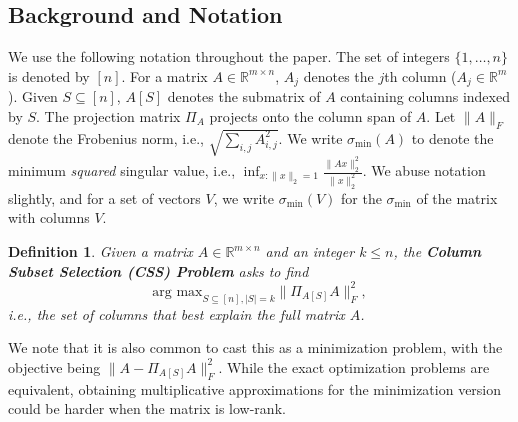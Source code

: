 \documentclass{article}
\newtheorem{defin}{Definition}\newtheorem{thm}{Theorem}\newtheorem{exe}{Exercise}\newtheorem{exa}{Example}\newtheorem{fact}{Fact}\newtheorem{prop}{Proposition}\newtheorem{lemma}{Lemma}\newtheorem{corol}{Corollary}\newtheorem{conj}{Conjecture}\newtheorem{remark}{Remark}\newtheorem{discussion}{Discussion}\newtheorem{conc}{Conclusion}
\newcommand{\Real}{\mathbb{R}}
\newcommand{\argmax}{\text{arg max}}
\newcommand{\norm}[1]{\lVert #1 \rVert}
\begin{document}
\subsection{Background and Notation}
We use the following notation throughout the paper. The set of integers $\{1, \dots, n\}$ is denoted by $[n]$. For a matrix $A \in \Real^{m \times n}$, $A_j$ denotes the $j$th column ($A_j \in \Real^m$). Given $S \subseteq [n]$, $A[S]$ denotes the submatrix of $A$ containing columns indexed by $S$. The projection matrix $\Pi_A$ projects onto the column span of $A$. Let $\norm{A}_F$ denote the Frobenius norm, i.e., $\sqrt{\sum_{i,j} A_{i, j}^2}$. We write $\sigma_{\min}(A)$ to denote the minimum \textit{squared} singular value, i.e., $\inf_{x:\norm{x}_2 = 1} \frac{\|Ax\|_2^2}{\|x\|_2^2}$. We abuse notation slightly, and for a set of vectors $V$, we write $\sigma_{\min}(V)$ for the $\sigma_{\min}$ of the matrix with columns $V$.

\iffalse
{\bf Submodular optimization.}  Given a finite set $\Omega$ and a set function $f : 2^{\Omega} \to \Real$, define the marginal gain of adding an element $x \in \Omega$ to a set $S \subseteq \Omega$ by $\Delta(x | S) = f(S \cup \{x\}) - f(S)$. $f$ is said to be submodular if $\Delta(x | S) \geq \Delta(x | T)$ for any subsets $S \subseteq T \subseteq \Omega$ and any element $x \in \Omega \setminus T$. This is a formalization of the well-known economic principle of decreasing marginal utility. $f$ is further said to be nonnegative if $f(S) \geq 0$ for any $S \subseteq \Omega$, and monotonically nondecreasing if $f(S) \leq f(T)$ for any $S \subseteq T \subseteq \Omega$. The theory of maximizing submodular functions subject to a cardinality constraint has been well studied, and has been shown to be NP-hard [Nemhauser and
Wolsey 1978; Feige 1998]. However, it is a key result in combinatorial optimization that a simple greedy algorithm to this problem for nonnegative, monotone nondecreasing submodular functions admits a $1 - \frac{1}{e}$ constant factor approximation [Nemhauser '78].
\fi

\begin{defin}\label{defn:css-problem}
Given a matrix $A \in \Real^{m \times n}$ and an integer $k \le n$, the \textbf{Column Subset Selection (CSS) Problem} asks to find
\[ \argmax_{S \subseteq [n], |S| = k} \norm{\Pi_{A[S]}A}_F^2, \]
i.e., the set of columns that {\em best explain} the full matrix $A$.
\end{defin}

We note that it is also common to cast this as a minimization problem, with the objective being $\norm{A - \Pi_{A[S]} A}_F^2$. While the exact optimization problems are equivalent, obtaining multiplicative approximations for the minimization version could be harder when the matrix is low-rank.
\end{document}

